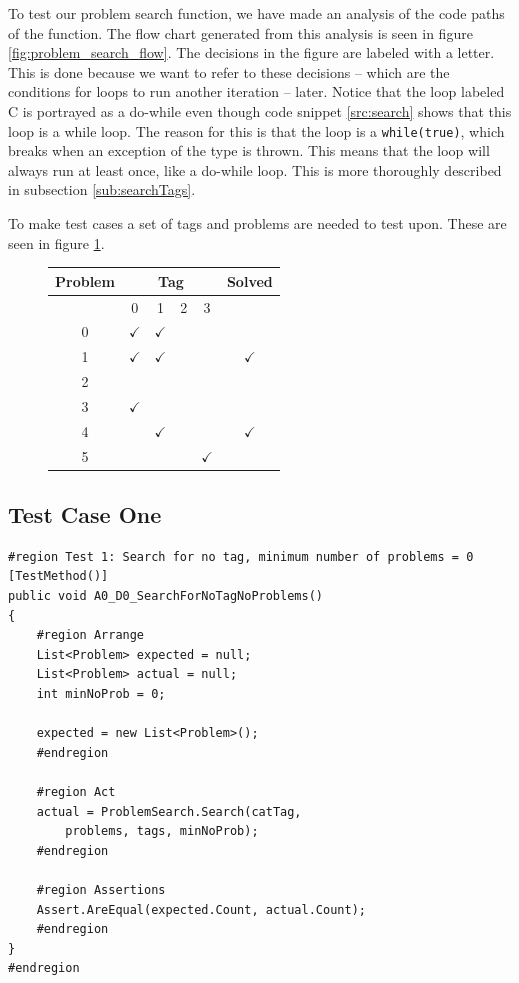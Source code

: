 To test our problem search function, we have made an analysis of the code paths of the function.
The flow chart generated from this analysis is seen in figure \ref{fig:problem_search_flow}.
The decisions in the figure are labeled with a letter.
This is done because we want to refer to these decisions -- which are the conditions for loops to run another iteration -- later.
Notice that the loop labeled C is portrayed as a do-while even though code snippet \ref{src:search} shows that this loop is a while loop.
The reason for this is that the loop is a \verb|while(true)|, which breaks when an exception of the type  is thrown.
This means that the loop will always run at least once, like a do-while loop.
This is more thoroughly described in subsection \ref{sub:searchTags}.

To make test cases a set of tags and problems are needed to test upon.
These are seen in figure \ref{tab:problem_search_base}.

\begin{figure}[htb]
	\centering
		\begin{tabular}{|c|c|c|c|c|c|}
		\hline
			Problem	& \multicolumn{4}{c|}{Tag} & Solved \\ \hline
								& 0&1&2&3& \\ \hline
			0					& $\checkmark$ & $\checkmark$ & & & \\ \hline
			1					& $\checkmark$ & $\checkmark$ & & & $\checkmark$  \\ \hline
			2					& & & & & \\ \hline
			3					& $\checkmark$& & & & \\ \hline
			4					& & $\checkmark$& & & $\checkmark$ \\ \hline
			5					& & & & $\checkmark$ & \\ \hline
		\end{tabular}
	\label{tab:problem_search_base}
\end{figure}


\subsection{Test Case One}
\begin{lstlisting}[style=sourceCode, caption=\myCaption{The test case for no run of any loops}, label=src:noLoops]
#region Test 1: Search for no tag, minimum number of problems = 0
[TestMethod()]
public void A0_D0_SearchForNoTagNoProblems()
{
	#region Arrange
	List<Problem> expected = null;
	List<Problem> actual = null;
	int minNoProb = 0;

	expected = new List<Problem>();
	#endregion

	#region Act
	actual = ProblemSearch.Search(catTag,
		problems, tags, minNoProb);
	#endregion

	#region Assertions
	Assert.AreEqual(expected.Count, actual.Count);
	#endregion
}
#endregion
\end{lstlisting}

